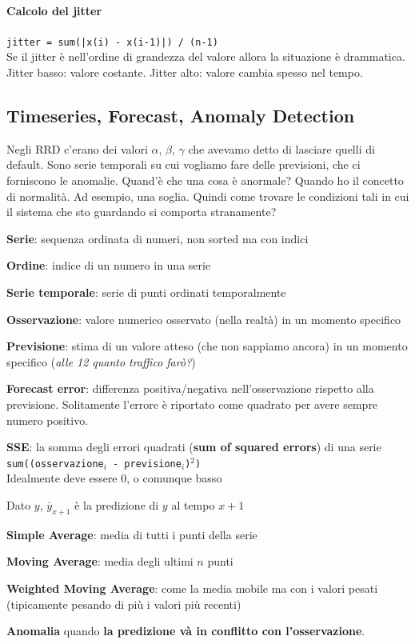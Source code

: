 \documentclass[10pt]{book}
\begin{document}
\paragraph{Calcolo del jitter} \texttt{jitter = sum(|x(i) - x(i-1)|) / (n-1)}\\
Se il jitter è nell'ordine di grandezza del valore allora la situazione è drammatica. Jitter basso: valore costante. Jitter alto: valore cambia spesso nel tempo.
\subsection{Timeseries, Forecast, Anomaly Detection}
Negli RRD c'erano dei valori $\alpha$, $\beta$, $\gamma$ che avevamo detto di lasciare quelli di default. Sono serie temporali su cui vogliamo fare delle previsioni, che ci forniscono le anomalie. Quand'è che una cosa è anormale? Quando ho il concetto di normalità. Ad esempio, una soglia. Quindi come trovare le condizioni tali in cui il sistema che sto guardando si comporta stranamente?\\
\begin{list}{}{\textbf{Definizioni}:}
	\item \textbf{Serie}: sequenza ordinata di numeri, non sorted ma con indici
	\item \textbf{Ordine}: indice di un numero in una serie
	\item \textbf{Serie temporale}: serie di punti ordinati temporalmente
	\item \textbf{Osservazione}: valore numerico osservato (nella realtà) in un momento specifico
	\item \textbf{Previsione}: stima di un valore atteso (che non sappiamo ancora) in un momento specifico (\textit{alle 12 quanto traffico farò?})
	\item \textbf{Forecast error}: differenza positiva/negativa nell'osservazione rispetto alla previsione. Solitamente l'errore è riportato come quadrato per avere sempre numero positivo.
	\item \textbf{SSE}: la somma degli errori quadrati (\textbf{sum of squared errors}) di una serie \texttt{sum((osservazione$_i$ - previsione$_i$)$^2$)}\\
	Idealmente deve essere 0, o comunque basso
	\item Dato $y$, $\overline{y}_{x+1}$ è la predizione di $y$ al tempo $x+1$
	\item \textbf{Simple Average}: media di tutti i punti della serie
	\item \textbf{Moving Average}: media degli ultimi $n$ punti
	\item \textbf{Weighted Moving Average}: come la media mobile ma con i valori pesati (tipicamente pesando di più i valori più recenti)
\end{list}
\textbf{Anomalia} quando \textbf{la predizione và in conflitto con l'osservazione}.
\pagebreak
\end{document}

